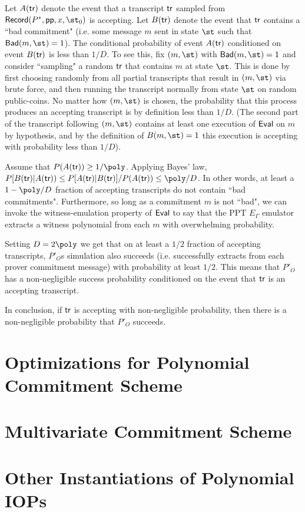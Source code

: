 Let $A(\textsf{{tr}})$ denote the event that a transcript $\textsf{{tr}}$ sampled from $\pro{Record}(P^*, \params, x, \st_0)$ is accepting. Let $B(\textsf{{tr}})$ denote the event that $\textsf{{tr}}$ contains a ``bad commitment" (i.e. some message $m$ sent in state $\st$ such that $\pro{Bad}(m, \st) = 1$). The conditional probability of event $A(\textsf{{tr}})$ conditioned on event $B(\textsf{{tr}})$ is less than $1/D$. To see this, fix $(m, \st)$ with $\pro{Bad}(m, \st) = 1$ and consider ``sampling" a random $\textsf{{tr}}$ that contains $m$ at state $\st$. This is done by first choosing randomly from all partial transcripts that result in $(m, \st)$ via brute force, and then running the transcript normally from state $\st$ on random public-coins. No matter how $(m, \st)$ is chosen, the probability that this process produces an accepting transcript is by definition less than $1/D$. (The second part of the transcript following $(m, \st)$ contains at least one execution of $\textsf{{Eval}}$ on $m$ by hypothesis, and by the definition of $B(m, \st) = 1$ this execution is accepting with probability less than $1/D$).

Assume that $P(A(\tr)) \geq 1/\poly$. Applying Bayes' law, %
$P[B(\tr) | A(\tr)) \leq P[A(\tr) | B(\tr)] / P(A(\tr)) \leq \poly / D$. 
In other words, at least a $1 - \poly/D$ fraction of accepting transcripts do not contain ``bad commitments". %
Furthermore, so long as a commitment $m$ is not ``bad", we can invoke the witness-emulation property of $\textsf{{Eval}}$ to say that the PPT $E_\Gamma$ emulator extracts a witness polynomial from each $m$ with overwhelming probability.


Setting $D = 2 \poly$ we get that on at least a $1/2$ fraction of accepting transcripts, $P'_O$s simulation also succeeds (i.e. successfully extracts from each prover commitment message) with probability at least $1/2$. This means that $P'_O$ has a non-negligible success probability conditioned on the event that $\textsf{{tr}}$ is an accepting transcript. 

In conclusion, if $\textsf{{tr}}$ is accepting with non-negligible probability, then there is a non-negligible probability that $P'_O$ succeeds. 


\section{Optimizations for Polynomial Commitment Scheme}
\label{subsec:optimization}

\section{Multivariate Commitment Scheme}
\label{sec:multivariate}




\ifappendix
\section{Other Instantiations of Polynomial IOPs} \label{appendix:other_polynomial_iops}


\fi


